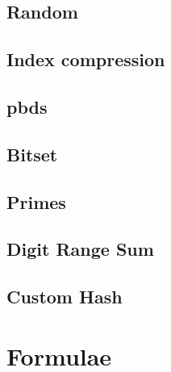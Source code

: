 \section{Random}


\section{Index compression}


\section{pbds}


\section{Bitset}


\section{Primes}


\section{Digit Range Sum}


\section{Custom Hash}


\chapter{Formulae}

